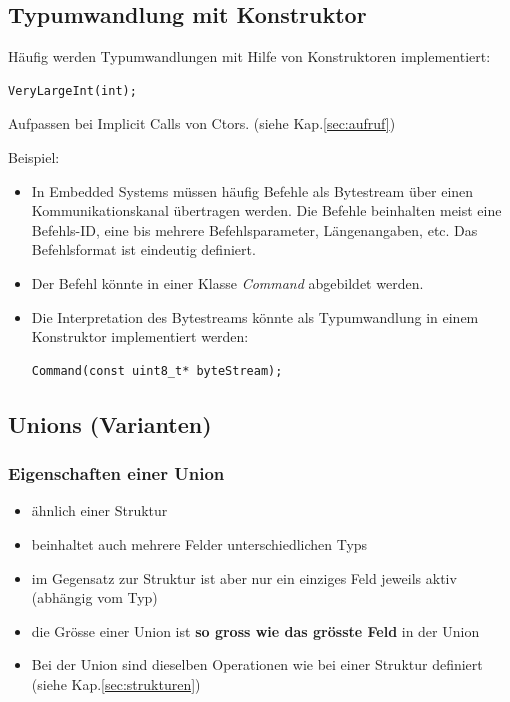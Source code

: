 \subsection{Typumwandlung mit Konstruktor}
Häufig werden Typumwandlungen mit Hilfe von Konstruktoren implementiert:\\
	\vspace{-\baselineskip}
	\begin{minipage}{0.3\linewidth}
\begin{lstlisting}
VeryLargeInt(int);
\end{lstlisting}
	\end{minipage}
	\item[\-] \begin{achtung}
		  Aufpassen bei Implicit Calls von Ctors. (siehe Kap.\ref{sec:aufruf})
		  \end{achtung}
Beispiel:
\begin{itemize}
	\item In Embedded Systems müssen häufig Befehle als Bytestream über einen Kommunikationskanal übertragen werden. Die Befehle beinhalten meist eine Befehls-ID, eine bis mehrere Befehlsparameter, Längenangaben, etc. Das Befehlsformat ist eindeutig definiert.
	\item Der Befehl könnte in einer Klasse \emph{Command} abgebildet werden.
	\item Die Interpretation des Bytestreams könnte als Typumwandlung in einem Konstruktor implementiert werden:\\
	\vspace{-\baselineskip}
	\begin{minipage}{0.45\linewidth}
\begin{lstlisting}
Command(const uint8_t* byteStream);
\end{lstlisting}
	\end{minipage}
\end{itemize}

\subsection{Unions (Varianten)}

\subsubsection{Eigenschaften einer Union}
\begin{itemize}
	\item ähnlich einer Struktur
	\item beinhaltet auch mehrere Felder unterschiedlichen Typs
	\item im Gegensatz zur Struktur ist aber nur ein einziges Feld jeweils aktiv (abhängig vom Typ)
	\item die Grösse einer Union ist \textbf{so gross wie das grösste Feld} in der Union
	\item Bei der Union sind dieselben Operationen wie bei einer Struktur definiert (siehe Kap.\ref{sec:strukturen})
\end{itemize}

